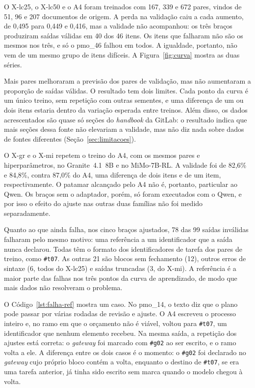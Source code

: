 O X-lc25, o X-lc50 e o A4 foram treinados com 167, 339 e 672 pares, vindos de 51, 96 e 207 documentos de origem. A perda na validação caiu a cada aumento, de 0,495 para 0,449 e 0,416, mas a validade não acompanhou: os três braços produziram saídas válidas em 40 dos 46 itens. Os itens que falharam não são os mesmos nos três, e só o pmo\_46 falhou em todos. A igualdade, portanto, não vem de um mesmo grupo de itens difíceis. A Figura~\ref{fig:curva} mostra as duas séries.



Mais pares melhoraram a previsão dos pares de validação, mas não aumentaram a proporção de saídas válidas. O resultado tem dois limites. Cada ponto da curva é um único treino, sem repetição com outras sementes, e uma diferença de um ou dois itens estaria dentro da variação esperada entre treinos. Além disso, os dados acrescentados são quase só seções do \textit{handbook} da GitLab: o resultado indica que mais seções dessa fonte não elevariam a validade, mas não diz nada sobre dados de fontes diferentes (Seção~\ref{sec:limitacoes}).

O X-gr e o X-mi repetem o treino do A4, com os mesmos pares e hiperparâmetros, no Granite~4.1~8B e no MiMo-7B-RL. A validade foi de 82,6\% e 84,8\%, contra 87,0\% do A4, uma diferença de dois itens e de um item, respectivamente. O patamar alcançado pelo A4 não é, portanto, particular ao Qwen. Os braços sem o adaptador, porém, só foram executados com o Qwen, e por isso o efeito do ajuste nas outras duas famílias não foi medido separadamente.

Quanto ao que ainda falha, nos cinco braços ajustados, 78 das 99 saídas inválidas falharam pelo mesmo motivo: uma referência a um identificador que a saída nunca declarou. Todas têm o formato dos identificadores de tarefa dos pares de treino, como \verb|#t07|. As outras 21 são blocos sem fechamento (12), outros erros de sintaxe (6, todos do X-lc25) e saídas truncadas (3, do X-mi). A referência é a maior parte das falhas nos três pontos da curva de aprendizado, de modo que mais dados não resolveram o problema.

O Código~\ref{lst:falha-ref} mostra um caso. No pmo\_14, o texto diz que o plano pode passar por várias rodadas de revisão e ajuste. O A4 escreveu o processo inteiro e, no ramo em que o orçamento não é viável, voltou para \verb|#t07|, um identificador que nenhum elemento recebeu. Na mesma saída, a repetição dos ajustes está correta: o \textit{gateway} foi marcado com \verb|#g02| ao ser escrito, e o ramo volta a ele. A diferença entre os dois casos é o momento: o \verb|#g02| foi declarado no \textit{gateway} cujo próprio bloco contém a volta, enquanto o destino de \verb|#t07|, se era uma tarefa anterior, já tinha sido escrito sem marca quando o modelo chegou à volta.

